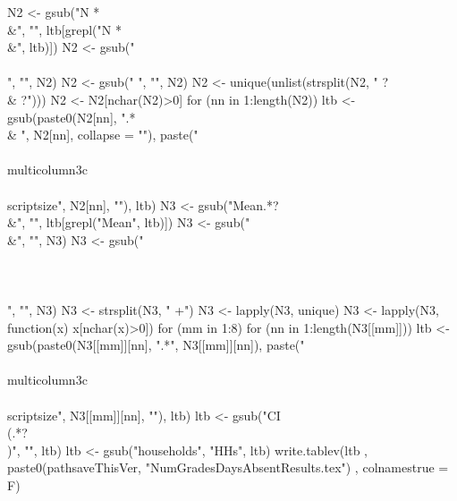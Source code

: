 \begin{Schunk}
\begin{Sinput}
N2 <- gsub("N *\\&", "", ltb[grepl("N *\\&", ltb)])
N2 <- gsub("\\\\", "", N2)
N2 <- gsub(" ", "", N2)
N2 <- unique(unlist(strsplit(N2, " ?\\& ?")))
N2 <- N2[nchar(N2)>0]
for (nn in 1:length(N2))
  ltb <- gsub(paste0(N2[nn], ".*\\& ", N2[nn], collapse = ""), 
    paste("\\\\multicolumn{3}{c}{\\\\scriptsize", N2[nn], "}"), ltb)
N3 <- gsub("Mean.*?\\&", "", ltb[grepl("Mean", ltb)])
N3 <- gsub("\\&", "", N3)
N3 <- gsub("\\\\\\\\", "", N3)
N3 <- strsplit(N3, " +")
N3 <- lapply(N3, unique)
N3 <- lapply(N3, function(x) x[nchar(x)>0])
for (mm in 1:8)
  for (nn in 1:length(N3[[mm]]))
    ltb <- gsub(paste0(N3[[mm]][nn], ".*", N3[[mm]][nn]),
      paste("\\\\multicolumn{3}{c}{\\\\scriptsize", N3[[mm]][nn], "}"), ltb)
ltb <- gsub("CI \\(.*?\\)", "", ltb)
ltb <- gsub("households", "HHs", ltb)
write.tablev(ltb
    ,  paste0(pathsaveThisVer, "NumGradesDaysAbsentResults.tex")
  ,  colnamestrue = F)
\end{Sinput}
\end{Schunk}

